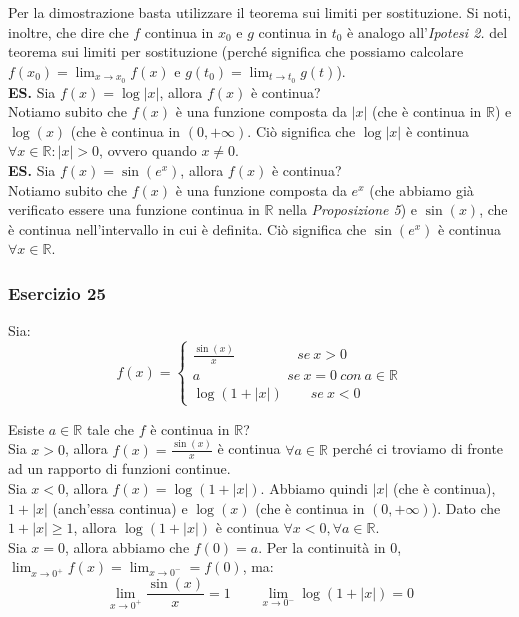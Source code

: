 \documentclass{article}
\begin{document}
\noindent Per la dimostrazione basta utilizzare il teorema sui limiti per sostituzione. Si noti, inoltre, che dire che $f$ continua in $x_0$ e $g$ continua in $t_0$ è analogo all'\textit{Ipotesi 2.} del teorema sui limiti per sostituzione (perché significa che possiamo calcolare $f(x_0) = \lim_{x \to x_0} f(x)$ e $g(t_0) = \lim_{t \to t_0} g(t)$). \\

\noindent\textbf{ES.} Sia $f(x) = \log|x|$, allora $f(x)$ è continua? \\
\noindent Notiamo subito che $f(x)$ è una funzione composta da $|x|$ (che è continua in $\mathbb{R}$) e $\log(x)$ (che è continua in $(0, +\infty)$. Ciò significa che $\log|x|$ è continua $\forall x \in \mathbb{R} : |x| > 0$, ovvero quando $x \neq 0$.\\

\noindent\textbf{ES.} Sia $f(x) = \sin(e^x)$, allora $f(x)$ è continua?\\
\noindent Notiamo subito che $f(x)$ è una funzione composta da $e^x$ (che abbiamo già verificato essere una funzione continua in $\mathbb{R}$ nella \textit{Proposizione 5}) e $\sin(x)$, che è continua nell'intervallo in cui è definita. Ciò significa che $\sin(e^x)$ è continua $\forall x \in \mathbb{R}$.

\subsubsection{Esercizio 25}
Sia:
\begin{equation*}
    f(x) = \begin{cases}
        \frac{\sin(x)}{x} \qquad \qquad \ \ se \ x > 0 \\
        a \qquad \qquad \qquad \ se \ x = 0 \ con \ a \in \mathbb{R} \\
        \log(1 + |x|) \qquad se \ x < 0
    \end{cases}
\end{equation*}

\noindent Esiste $a \in \mathbb{R}$ tale che $f$ è continua in $\mathbb{R}$?\\

\noindent Sia $x > 0$, allora $f(x) = \frac{\sin(x)}{x}$ è continua $\forall a \in \mathbb{R}$ perché ci troviamo di fronte ad un rapporto di funzioni continue. \\
\noindent Sia $x < 0$, allora $f(x) = \log(1 + |x|)$. Abbiamo quindi $|x|$ (che è continua), $1 + |x|$ (anch'essa continua) e $\log(x)$ (che è continua in $(0, +\infty)$). Dato che $1 + |x| \geq 1$, allora $\log(1 + |x|)$ è continua $\forall x < 0, \forall a \in \mathbb{R}$.\\
\noindent Sia $x = 0$, allora abbiamo che $f(0) = a$. Per la continuità in $0$, $\lim_{x \to 0^+} f(x) = \lim_{x \to 0^-} = f(0)$, ma:
\begin{equation*}
    \lim_{x \to 0^+} \frac{\sin(x)}{x} = 1 \qquad \lim_{x \to 0^-} \log(1 + |x|) = 0
\end{equation*}
\end{document}
